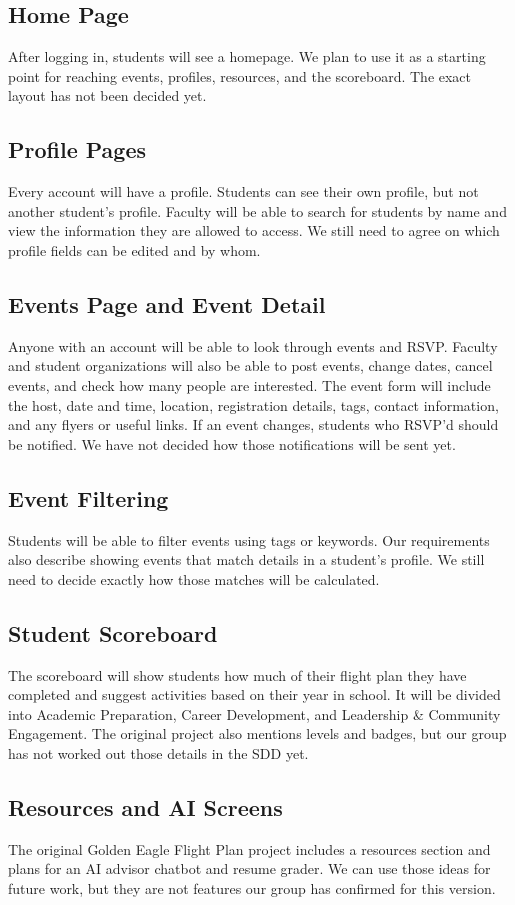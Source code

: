 \subsection{Home Page}
After logging in, students will see a homepage. We plan to use it as a starting point for reaching events, profiles, resources, and the scoreboard. The exact layout has not been decided yet.
\subsection{Profile Pages}
Every account will have a profile. Students can see their own profile, but not another student's profile. Faculty will be able to search for students by name and view the information they are allowed to access. We still need to agree on which profile fields can be edited and by whom.
\subsection{Events Page and Event Detail}
Anyone with an account will be able to look through events and RSVP. Faculty and student organizations will also be able to post events, change dates, cancel events, and check how many people are interested. The event form will include the host, date and time, location, registration details, tags, contact information, and any flyers or useful links. If an event changes, students who RSVP'd should be notified. We have not decided how those notifications will be sent yet.
\subsection{Event Filtering}
Students will be able to filter events using tags or keywords. Our requirements also describe showing events that match details in a student's profile. We still need to decide exactly how those matches will be calculated.
\subsection{Student Scoreboard}
The scoreboard will show students how much of their flight plan they have completed and suggest activities based on their year in school. It will be divided into Academic Preparation, Career Development, and Leadership \& Community Engagement. The original project also mentions levels and badges, but our group has not worked out those details in the SDD yet.
\subsection{Resources and AI Screens}
The original Golden Eagle Flight Plan project includes a resources section and plans for an AI advisor chatbot and resume grader. We can use those ideas for future work, but they are not features our group has confirmed for this version.
